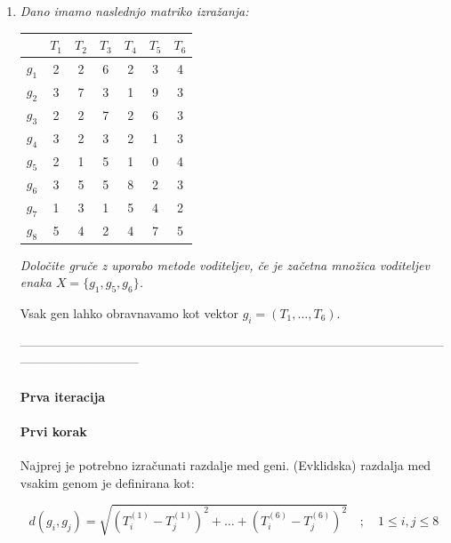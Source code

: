 \documentclass{article}
\begin{document}
\begin{enumerate}
		\newpage

	\item \textit{Dano imamo naslednjo matriko izražanja:}

		\begin{center}
			\begin{tabular}{c||c|c|c|c|c|c|}
				& $T_1$ & $T_2$ & $T_3$ & $T_4$ & $T_5$ & $T_6$ \\
				\hline
				\hline
				$g_1$ & 2 & 2 & 6 & 2 & 3 & 4 \\
				\hline
				$g_2$ & 3 & 7 & 3 & 1 & 9 & 3 \\
				\hline
				$g_3$ & 2 & 2 & 7 & 2 & 6 & 3 \\
				\hline
				$g_4$ & 3 & 2 & 3 & 2 & 1 & 3 \\
				\hline
				$g_5$ & 2 & 1 & 5 & 1 & 0 & 4 \\
				\hline
				$g_6$ & 3 & 5 & 5 & 8 & 2 & 3 \\
				\hline
				$g_7$ & 1 & 3 & 1 & 5 & 4 & 2 \\
				\hline
				$g_8$ & 5 & 4 & 2 & 4 & 7 & 5
			\end{tabular}
		\end{center}

		\textit{Določite gruče z uporabo metode voditeljev, če je začetna množica voditeljev
		enaka $X = \{g_1, g_5, g_6\}$.}

		Vsak gen lahko obravnavamo kot vektor $g_i = (T_1, \dots, T_6)$.

		-----------------------------------------------------------------------------------------------------------------------------------

		\begin{center}
			\paragraph{Prva iteracija}
		\end{center}

		\paragraph{Prvi korak} Najprej je potrebno izračunati razdalje med geni.
		(Evklidska) razdalja med vsakim genom je definirana kot:

		\begin{equation}
			d(g_i, g_j) = \sqrt{ \left(T_{i}^{(1)} - T_{j}^{(1)} \right)^2 + \dots + \left(T_{i}^{(6)} - T_{j}^{(6)} \right)^2 } \quad ; \quad 1 \leq i,j \leq 8
		\end{equation}


\end{enumerate}
\end{document}
